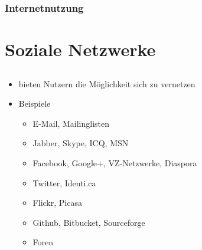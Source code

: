\documentclass{beamer}
\begin{document}
\begin{frame}
  \frametitle{Internetnutzung}
\end{frame}


\section{Soziale Netzwerke}
\subsection{}

\begin{frame}
  \begin{itemize}
  \frametitle{Soziale Netzwerke}
    \item<2-> bieten Nutzern die Möglichkeit sich zu vernetzen
    \item<3-> Beispiele
      \begin{itemize}
        \item<4-> E-Mail, Mailinglisten
        \item<5-> Jabber, Skype, ICQ, MSN
        \item<6-> Facebook, Google+, VZ-Netzwerke, Diaspora
        \item<7-> Twitter, Identi.ca
        \item<8-> Flickr, Picasa
        \item<9-> Github, Bitbucket, Sourceforge
        \item<10-> Foren
      \end{itemize}
  \end{itemize}
\end{frame}
\end{document}
